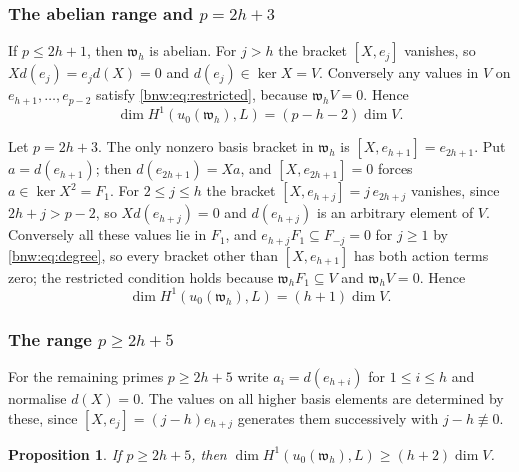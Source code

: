 \documentclass[11pt,reqno]{amsart}
\newtheorem{proposition}[proposition]{Proposition}
\theoremstyle{definition}
\theoremstyle{remark}
\theoremstyle{definition}
\begin{document}
\subsubsection{The abelian range and $p=2h+3$}

If $p\le2h+1$, then $\mathfrak{w}_h$ is abelian. For $j>h$ the bracket
$[X,e_j]$ vanishes, so $Xd(e_j)=e_jd(X)=0$ and $d(e_j)\in\ker X=V$.
Conversely any values in $V$ on $e_{h+1},\ldots,e_{p-2}$ satisfy
\eqref{bnw:eq:restricted}, because $\mathfrak{w}_hV=0$. Hence
\begin{equation}\label{bnw:eq:abelian}
\dim H^1(u_0(\mathfrak{w}_h),L)=(p-h-2)\dim V.
\end{equation}

Let $p=2h+3$. The only nonzero basis bracket in $\mathfrak{w}_h$ is
$[X,e_{h+1}]=e_{2h+1}$. Put $a=d(e_{h+1})$; then $d(e_{2h+1})=Xa$, and
$[X,e_{2h+1}]=0$ forces $a\in\ker X^2=F_1$. For $2\le j\le h$ the
bracket $[X,e_{h+j}]=j\,e_{2h+j}$ vanishes, since $2h+j>p-2$, so
$Xd(e_{h+j})=0$ and $d(e_{h+j})$ is an arbitrary element of $V$.
Conversely all these values lie in $F_1$, and
$e_{h+j}F_1\subseteq F_{-j}=0$ for $j\ge1$ by \eqref{bnw:eq:degree}, so
every bracket other than $[X,e_{h+1}]$ has both action terms zero;
the restricted condition holds because $\mathfrak{w}_hF_1\subseteq V$ and
$\mathfrak{w}_hV=0$. Hence
\begin{equation}\label{bnw:eq:first}
\dim H^1(u_0(\mathfrak{w}_h),L)=(h+1)\dim V.
\end{equation}

\subsubsection{The range $p\ge2h+5$}

For the remaining primes $p\ge2h+5$ write $a_i=d(e_{h+i})$ for
$1\le i\le h$ and normalise $d(X)=0$. The values on all higher basis elements are determined by these,
since $[X,e_j]=(j-h)e_{h+j}$ generates them successively with
$j-h\not\equiv0$.

\begin{proposition}\label{bnw:prop:lower}
If $p\ge2h+5$, then $\dim H^1(u_0(\mathfrak{w}_h),L)\ge(h+2)\dim V$.
\end{proposition}
\end{document}
